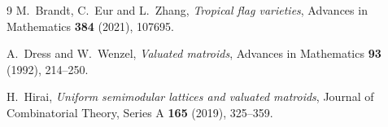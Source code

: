 \documentclass[12pt]{article}
\begin{document}
\begin{thebibliography}{9}
M.~Brandt, C.~Eur and L.~Zhang,
\emph{Tropical flag varieties},
Advances in Mathematics \textbf{384} (2021), 107695.

A.~Dress and W.~Wenzel,
\emph{Valuated matroids},
Advances in Mathematics \textbf{93} (1992), 214--250.

H.~Hirai,
\emph{Uniform semimodular lattices and valuated matroids},
Journal of Combinatorial Theory, Series A \textbf{165} (2019),
325--359.
\end{thebibliography}
\end{document}

